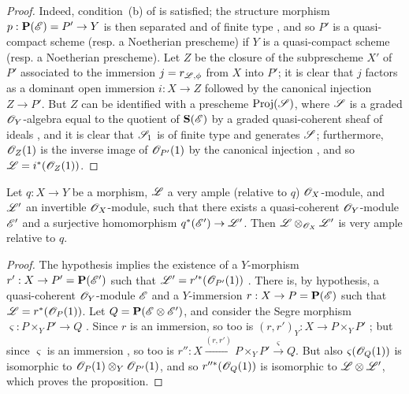 \begin{proof}
Indeed, condition~(b) of  is satisfied;
the structure morphism $p:\bb{P}(\sh{E})=P'\to Y$ is then separated and of finite type , and so $P'$ is a quasi-compact scheme (resp. a Noetherian prescheme) if $Y$ is a quasi-compact scheme (resp. a Noetherian prescheme).
Let $Z$ be the closure  of the subprescheme $X'$ of $P'$ associated to the immersion $j=r_{\mathscr{L},\phi}$ from $X$ into $P'$;
it is clear that $j$ factors as a dominant open immersion $i:X\to Z$ followed by the canonical injection $Z\to P'$.
But $Z$ can be identified with a prescheme $\operatorname{Proj}(\mathscr{S})$, where $\mathscr{S}$ is a graded $\mathscr{O}_Y$-algebra equal to the quotient of $\mathbf{S}(\mathscr{E})$ by a graded quasi-coherent sheaf of ideals , and it is clear that $\mathscr{S}_1$ is of finite type and generates $\mathscr{S}$;
furthermore, $\mathscr{O}_Z(1)$ is the inverse image of $\mathscr{O}_{P'}(1)$ by the canonical injection , and so $\mathscr{L}=i^*(\mathscr{O}_Z(1))$.
\end{proof}

\begin{proposition}[4.4.8]
\label{II.4.4.8}
Let $q:X\to Y$ be a morphism, $\mathscr{L}$ a very ample (relative to $q$) $\mathscr{O}_X$-module, and $\mathscr{L}'$ an invertible $\mathscr{O}_X$-module, such that there exists a quasi-coherent $\mathscr{O}_Y$-module $\mathscr{E}'$ and a surjective homomorphism $q^*(\sh{E}')\to\sh{L}'$.
Then $\mathscr{L}\otimes_{\mathscr{O}_X}\mathscr{L}'$ is very ample relative to $q$.
\end{proposition}

\begin{proof}
The hypothesis implies the existence of a $Y$-morphism $r':X\to P'=\bb{P}(\sh{E}')$ such that $\mathscr{L}'=r'^*(\mathscr{O}_{P'}(1))$ .
There is, by hypothesis, a quasi-coherent $\mathscr{O}_Y$-module $\mathscr{E}$ and a
$Y$-immersion $r:X\to P=\bb{P}(\sh{E})$ such that $\mathscr{L}=r^*(\mathscr{O}_P(1))$.
Let $Q=\mathbf{P}(\mathscr{E}\otimes\mathscr{E}')$, and consider the Segre morphism $\varsigma:P\times_Y P'\to Q$ .
Since $r$ is an immersion, so too is $(r,r')_Y:X\to P\times_Y P'$ ;
but since $\varsigma$ is an immersion , so too is $r'':X\xrightarrow{(r,r')}P\times_Y P'\xrightarrow{\varsigma}Q$.
But also  $\varsigma(\mathscr{O}_Q(1))$ is isomorphic to $\mathscr{O}_P(1)\otimes_Y\mathscr{O}_{P'}(1)$, and so  $r''^*(\mathscr{O}_Q(1))$ is isomorphic to $\mathscr{L}\otimes\mathscr{L}'$, which proves the proposition.
\end{proof}


